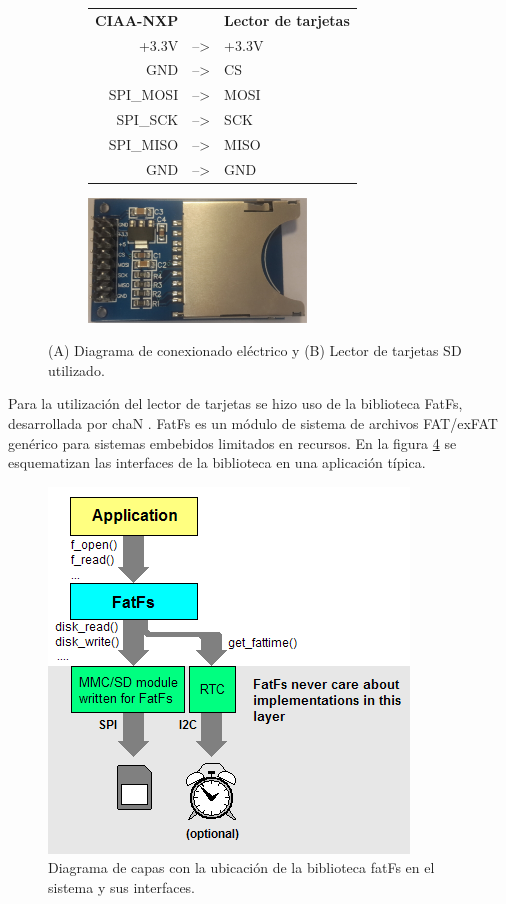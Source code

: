 \vspace{20px}

\begin{figure}[h]
	\centering
	\begin{subfigure}{.4\textwidth}
		\centering
		\begin{tabular}{rll}
			\textbf{CIAA-NXP }&	& \textbf{Lector de tarjetas}\\
			+3.3V     & --\textgreater{} & +3.3V   \\
			GND       & --\textgreater{} & CS  \\
			SPI\_MOSI & --\textgreater{} & MOSI  \\
			SPI\_SCK  & --\textgreater{} & SCK \\
			SPI\_MISO & --\textgreater{} & MISO  \\
			GND       & --\textgreater{} & GND  \\
		\end{tabular}
		\caption{ }
  		\label{fig:lector_conexionado}
	\end{subfigure}%
	\begin{subfigure}{.6\textwidth}
	\hspace{15px}
		\centering
		\includegraphics[height=3.3cm]{./Figures/sdCardReader.jpg}
		\caption{ }
		\label{fig:lector_hardware}
	\end{subfigure}
	\caption{(A) Diagrama de conexionado eléctrico y (B) Lector de tarjetas SD utilizado.}
	\label{fig:lector_sdCard}
\end{figure}

\vspace{10px}

Para la utilización del lector de tarjetas se hizo uso de la biblioteca FatFs, desarrollada por chaN \citep{fatFS}. FatFs es un módulo de sistema de archivos FAT/exFAT genérico para sistemas embebidos limitados en recursos. En la figura \ref{fig:chan} se esquematizan las interfaces de la biblioteca en una aplicación típica. 

\begin{figure}[htpb]
	\centering
	\includegraphics[width=.43\textwidth]{./Figures/chan.png}
	\caption[Diagrama de capas de fatFs]{Diagrama de capas con la ubicación de la biblioteca fatFs en el sistema y sus interfaces\protect\footnotemark.}
	\label{fig:chan}
\end{figure}

